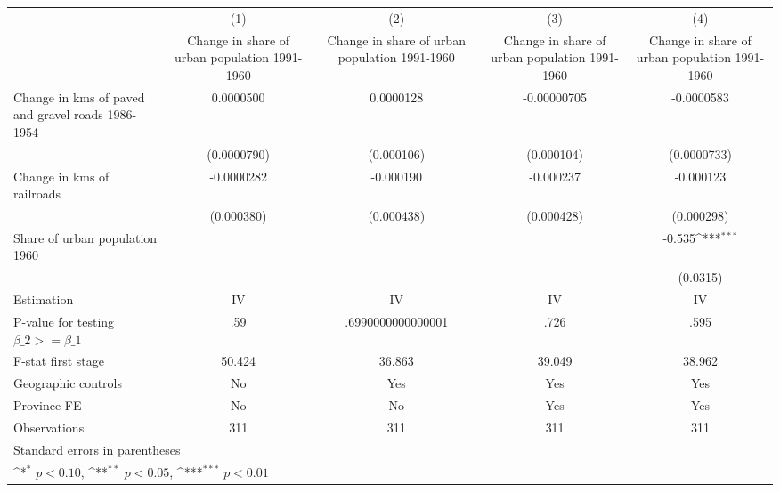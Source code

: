 {
\def\sym#1{\ifmmode^{#1}\else\(^{#1}\)\fi}
\begin{tabular}{l*{4}{c}}
\hline\hline
                    &\multicolumn{1}{c}{(1)}&\multicolumn{1}{c}{(2)}&\multicolumn{1}{c}{(3)}&\multicolumn{1}{c}{(4)}\\
                    &\multicolumn{1}{c}{Change in share of urban population 1991-1960}&\multicolumn{1}{c}{Change in share of urban population 1991-1960}&\multicolumn{1}{c}{Change in share of urban population 1991-1960}&\multicolumn{1}{c}{Change in share of urban population 1991-1960}\\
\hline
Change in kms of paved and gravel roads 1986-1954&   0.0000500         &   0.0000128         & -0.00000705         &  -0.0000583         \\
                    & (0.0000790)         &  (0.000106)         &  (0.000104)         & (0.0000733)         \\
[1em]
Change in kms of railroads&  -0.0000282         &   -0.000190         &   -0.000237         &   -0.000123         \\
                    &  (0.000380)         &  (0.000438)         &  (0.000428)         &  (0.000298)         \\
[1em]
Share of urban population 1960&                     &                     &                     &      -0.535\sym{***}\\
                    &                     &                     &                     &    (0.0315)         \\
\hline
Estimation          &          IV         &          IV         &          IV         &          IV         \\
P-value for testing $\beta\_2 >= \beta\_1$&         .59         &.6990000000000001         &        .726         &        .595         \\
F-stat first stage  &      50.424         &      36.863         &      39.049         &      38.962         \\
Geographic controls &          No         &         Yes         &         Yes         &         Yes         \\
Province FE         &          No         &          No         &         Yes         &         Yes         \\
Observations        &         311         &         311         &         311         &         311         \\
\hline\hline
\multicolumn{5}{l}{\footnotesize Standard errors in parentheses}\\
\multicolumn{5}{l}{\footnotesize \sym{*} \(p<0.10\), \sym{**} \(p<0.05\), \sym{***} \(p<0.01\)}\\
\end{tabular}
}
